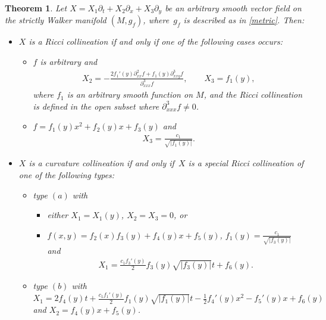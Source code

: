 \documentclass[10pt,a4paper]{amsart}
\numberwithin{equation}{section}
\newtheorem{Theorem}{Theorem}[section]
\begin{document}
\begin{Theorem}\label{RicciCol}
Let $X=X_1\partial_t+X_2\partial_x+X_3\partial_y$ be an arbitrary smooth vector field on the strictly Walker manifold $(M,g_f)$, where~$g_f$ is described as in \eqref{metric}. Then:
\begin{itemize}\itemsep=0pt
\item[$i)$] $X$ is a Ricci collineation if and only if one of the following cases occurs:
\begin{itemize}\itemsep=0pt
\item[$(a)$] $f$ is arbitrary and
\begin{gather*}X_2=-\frac{2f_1 '(y)\partial_{xx}^2f+f_1(y)\partial_{xxy}^3f}{\partial_{xxx}^3f}, \qquad X_3=f_1(y),\end{gather*}
where $f_1$ is an arbitrary smooth function on $M$, and the Ricci collineation is defined in the open subset where $\partial_{xxx}^3f \neq 0$.
\item[$(b)$] $f=f_1(y)x^2+f_2(y)x+f_3(y)$ and \begin{gather*}X_3=\frac{c_1}{\sqrt{|f_1(y)|}}.\end{gather*}
\end{itemize}

\item[$ii)$] $X$ is a curvature collineation if and only if~$X$ is a special Ricci collineation of one of the following types:
\begin{itemize}\itemsep=0pt
\item[$(a)^\prime$] type $(a)$ with
\begin{itemize}\itemsep=0pt
\item[$\bullet$] either $X_1=X_1 (y)$, $X_2=X_3=0$, or
\item[$\bullet$] $f(x,y)=f_2(x)f_3(y)+f_4(y)x+f_5(y)$, $f_1(y)=\frac{c_1}{\sqrt{|f_3(y)|}}$ and
\begin{gather*} X_1=\frac{c_1f_3 '(y)}2f_3(y)\sqrt{|f_3(y)|}t+f_6(y).\end{gather*}
\end{itemize}

\item[$(b)^\prime$] type $(b)$ with $X_1=2f_4(y)t+\frac{c_1f_1 '(y)}2f_1(y)\sqrt{|f_1(y)|}t-\frac12f_4 '(y) x^2-f_5 '(y) x+f_6(y)$ and $X_2=f_4(y)x+f_5(y)$.
\end{itemize}
\end{itemize}
\end{Theorem}
\end{document}
